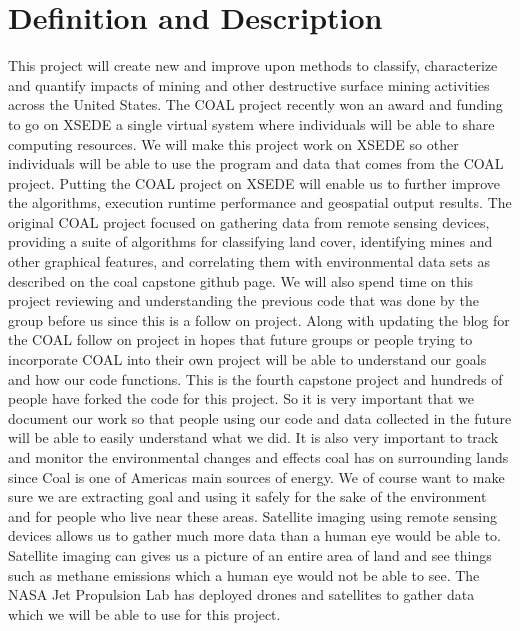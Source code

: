 \documentclass{article}
\begin{document}
\newpage
\section*{Definition and Description}
This project will create new and improve upon methods to classify, characterize
and quantify impacts of mining and other destructive surface mining activities
across the United States. The COAL project recently won an award and funding to
go on XSEDE a single virtual system where individuals will be able to share
computing resources. We will make this project work on XSEDE so other
individuals will be able to use the program and data that comes from the COAL
project. Putting the COAL project on XSEDE will enable us to further improve
the algorithms, execution runtime performance and geospatial output results.
The original COAL project focused on gathering data from remote sensing devices,
providing a suite of algorithms for classifying land cover, identifying mines
and other graphical features, and correlating them with environmental data sets
as described on the coal capstone github page. We will also spend time on this
project reviewing and understanding the previous code that was done by the
group before us since this is a follow on project. Along with updating the blog
for the COAL follow on project in hopes that future groups or people trying to
incorporate COAL into their own project will be able to understand our goals
and how our code functions. This is the fourth capstone project and hundreds of
people have forked the code for this project. So it is very important that we
document our work so that people using our code and data collected in the
future will be able to easily understand what we did. It is also very important
to track and monitor the environmental changes and effects coal has on
surrounding lands since Coal is one of Americas main sources of energy. We of
course want to make sure we are extracting goal and using it safely for the
sake of the environment and for people who live near these areas. Satellite
imaging using remote sensing devices allows us to gather much more data than a
human eye would be able to. Satellite imaging can gives us a picture of an
entire area of land and see things such as methane emissions which a human eye
would not be able to see. The NASA Jet Propulsion Lab has deployed drones and
satellites to gather data which we will be able to use for this project.
\end{document}
